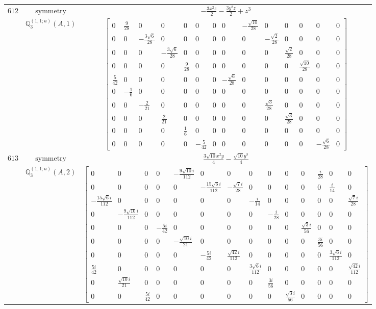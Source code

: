 \documentclass[fleqn,8pt,landscape]{jsarticle}
\begin{document}
\begin{longtable}{ccc}
$ 612 $ & $ \text{symmetry} $ & $ - \frac{3 x^{2} z}{2} - \frac{3 y^{2} z}{2} + z^{3} $ \\
$  $ & $ \mathbb{Q}_{3}^{(1,1;a)}(A,1) $ & $ \begin{bmatrix} 0 & \frac{9}{28} & 0 & 0 & 0 & 0 & 0 & 0 & - \frac{\sqrt{10}}{28} & 0 & 0 & 0 & 0 & 0 \\ 0 & 0 & - \frac{3 \sqrt{6}}{28} & 0 & 0 & 0 & 0 & 0 & 0 & - \frac{\sqrt{2}}{28} & 0 & 0 & 0 & 0 \\ 0 & 0 & 0 & - \frac{3 \sqrt{6}}{28} & 0 & 0 & 0 & 0 & 0 & 0 & \frac{\sqrt{2}}{28} & 0 & 0 & 0 \\ 0 & 0 & 0 & 0 & \frac{9}{28} & 0 & 0 & 0 & 0 & 0 & 0 & \frac{\sqrt{10}}{28} & 0 & 0 \\ \frac{5}{42} & 0 & 0 & 0 & 0 & 0 & 0 & - \frac{\sqrt{6}}{28} & 0 & 0 & 0 & 0 & 0 & 0 \\ 0 & - \frac{1}{6} & 0 & 0 & 0 & 0 & 0 & 0 & 0 & 0 & 0 & 0 & 0 & 0 \\ 0 & 0 & - \frac{2}{21} & 0 & 0 & 0 & 0 & 0 & 0 & \frac{\sqrt{3}}{28} & 0 & 0 & 0 & 0 \\ 0 & 0 & 0 & \frac{2}{21} & 0 & 0 & 0 & 0 & 0 & 0 & \frac{\sqrt{3}}{28} & 0 & 0 & 0 \\ 0 & 0 & 0 & 0 & \frac{1}{6} & 0 & 0 & 0 & 0 & 0 & 0 & 0 & 0 & 0 \\ 0 & 0 & 0 & 0 & 0 & - \frac{5}{42} & 0 & 0 & 0 & 0 & 0 & 0 & - \frac{\sqrt{6}}{28} & 0 \end{bmatrix} $ \\ \hline
$ 613 $ & $ \text{symmetry} $ & $ \frac{3 \sqrt{10} x^{2} y}{4} - \frac{\sqrt{10} y^{3}}{4} $ \\
$  $ & $ \mathbb{Q}_{3}^{(1,1;a)}(A,2) $ & $ \begin{bmatrix} 0 & 0 & 0 & 0 & - \frac{9 \sqrt{10} i}{112} & 0 & 0 & 0 & 0 & 0 & 0 & \frac{i}{28} & 0 & 0 \\ 0 & 0 & 0 & 0 & 0 & - \frac{15 \sqrt{6} i}{112} & - \frac{\sqrt{7} i}{28} & 0 & 0 & 0 & 0 & 0 & \frac{i}{14} & 0 \\ - \frac{15 \sqrt{6} i}{112} & 0 & 0 & 0 & 0 & 0 & 0 & - \frac{i}{14} & 0 & 0 & 0 & 0 & 0 & \frac{\sqrt{7} i}{28} \\ 0 & - \frac{9 \sqrt{10} i}{112} & 0 & 0 & 0 & 0 & 0 & 0 & - \frac{i}{28} & 0 & 0 & 0 & 0 & 0 \\ 0 & 0 & 0 & - \frac{5 i}{42} & 0 & 0 & 0 & 0 & 0 & 0 & \frac{\sqrt{3} i}{56} & 0 & 0 & 0 \\ 0 & 0 & 0 & 0 & - \frac{\sqrt{10} i}{21} & 0 & 0 & 0 & 0 & 0 & 0 & \frac{3 i}{56} & 0 & 0 \\ 0 & 0 & 0 & 0 & 0 & - \frac{5 i}{42} & \frac{\sqrt{42} i}{112} & 0 & 0 & 0 & 0 & 0 & \frac{3 \sqrt{6} i}{112} & 0 \\ \frac{5 i}{42} & 0 & 0 & 0 & 0 & 0 & 0 & \frac{3 \sqrt{6} i}{112} & 0 & 0 & 0 & 0 & 0 & \frac{\sqrt{42} i}{112} \\ 0 & \frac{\sqrt{10} i}{21} & 0 & 0 & 0 & 0 & 0 & 0 & \frac{3 i}{56} & 0 & 0 & 0 & 0 & 0 \\ 0 & 0 & \frac{5 i}{42} & 0 & 0 & 0 & 0 & 0 & 0 & \frac{\sqrt{3} i}{56} & 0 & 0 & 0 & 0 \end{bmatrix} $ \\ \hline

\end{longtable}
\end{document}
